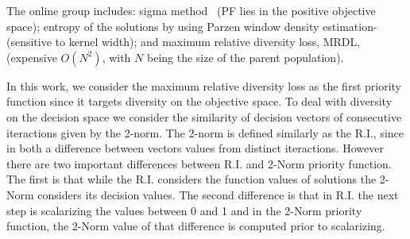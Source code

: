 The online group includes: sigma method~\cite{mostaghim2003strategies}  (PF lies in the positive objective space); entropy of the solutions by using Parzen window density estimation-\cite{tan2008evolutionary} (sensitive to kernel width); and maximum relative diversity loss, MRDL, ~\cite{gee2015online} (expensive $O(N^2)$, with $N$ being the size of the parent population).

In this work, we consider the maximum relative diversity loss as the first priority function since it targets diversity on the objective space. To deal with diversity on the decision space we consider the similarity of decision vectors of consecutive iteractions given by the 2-norm. The 2-norm is defined similarly as the R.I., since in both a difference between vectors values from distinct iteractions. However there are two important differences between R.I. and 2-Norm priority function. The first is that while the R.I. considers the function values of solutions the 2-Norm considers its decision values. The second difference is that in R.I. the next step is scalarizing the values between 0 and 1 and in the 2-Norm priority function, the 2-Norm value of that difference is computed prior to scalarizing. 







